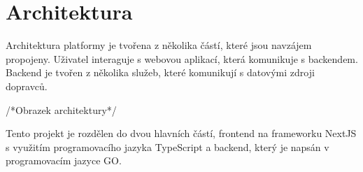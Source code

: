 \section{Architektura}
Architektura platformy je tvořena z několika částí, které jsou navzájem propojeny. Uživatel interaguje s webovou aplikací, která komunikuje s backendem. Backend je tvořen z několika služeb, které komunikují s datovými zdroji dopravců.
\par
/*Obrazek architektury*/
\par
Tento projekt je rozdělen do dvou hlavních částí, frontend na frameworku NextJS s využitím programovacího jazyka TypeScript a backend, který je napsán v programovacím jazyce GO.